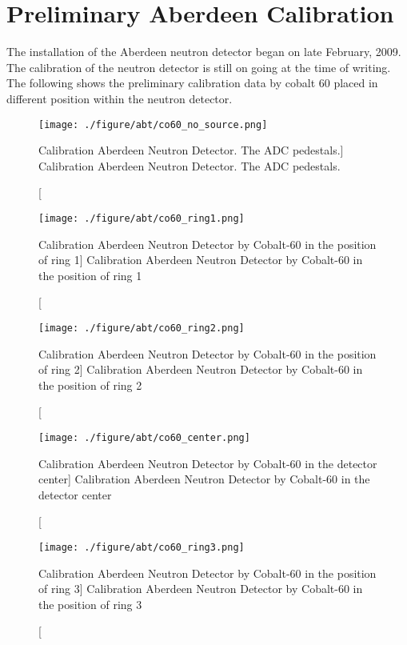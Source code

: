 \section {Preliminary Aberdeen Calibration}

The installation of the Aberdeen neutron detector began on late February, 2009.
The calibration of the neutron detector is still on going at the time of writing.
The following shows the preliminary calibration data by cobalt 60 placed in different
position within the neutron detector.


\begin{figure}
    \centering
    \texttt{[image: ./figure/abt/co60\_no\_source.png]}
    \caption
    [Calibration Aberdeen Neutron Detector. The ADC pedestals.]
    {Calibration Aberdeen Neutron Detector. The ADC pedestals.}
    \label{fig:co60_no_source.png}
    \end{figure}


\begin{figure}
    \centering
    \texttt{[image: ./figure/abt/co60\_ring1.png]}
    \caption
    [Calibration Aberdeen Neutron Detector by Cobalt-60 in the position of ring 1]
    {Calibration Aberdeen Neutron Detector by Cobalt-60 in the position of ring 1}
    \label{fig:co60_ring1.png}
    \end{figure}

\begin{figure}
    \centering
    \texttt{[image: ./figure/abt/co60\_ring2.png]}
    \caption
    [Calibration Aberdeen Neutron Detector by Cobalt-60 in the position of ring 2]
    {Calibration Aberdeen Neutron Detector by Cobalt-60 in the position of ring 2}
    \label{fig:co60_ring2.png}
    \end{figure}


\begin{figure}
    \centering
    \texttt{[image: ./figure/abt/co60\_center.png]}
    \caption
    [Calibration Aberdeen Neutron Detector by Cobalt-60 in the detector center]
    {Calibration Aberdeen Neutron Detector by Cobalt-60 in the detector center}
    \label{fig:co60_ring1.png}
    \end{figure}






\begin{figure}
    \centering
    \texttt{[image: ./figure/abt/co60\_ring3.png]}
    \caption
    [Calibration Aberdeen Neutron Detector by Cobalt-60 in the position of ring 3]
    {Calibration Aberdeen Neutron Detector by Cobalt-60 in the position of ring 3}
    \label{fig:co60_ring3.png}
    \end{figure}






